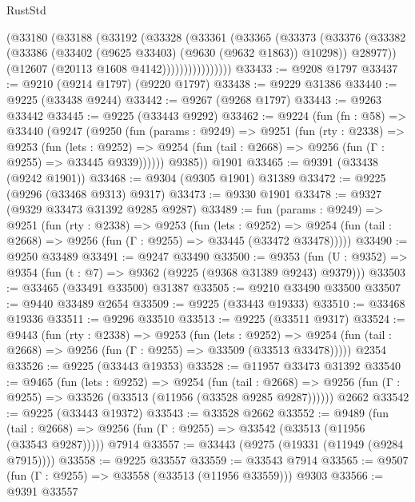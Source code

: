 \begin{lexlean}{RustStd}
\begin{coremodule}
                  (@33180
                    (@33188
                      (@33192
                        (@33328
                          (@33361
                            (@33365
                              (@33373
                                (@33376
                                  (@33382
                                    (@33386 (@33402 (@9625 @33403) (@9630 (@9632 @1863)) @10298))
                                    @28977))
                                (@12607 (@20113 @1608 @4142))))))))))))))))
@33433 := @9208 @1797
@33437 := @9210 (@9214 @1797) (@9220 @1797)
@33438 := @9229 @31386
@33440 := @9225 (@33438 @9244)
@33442 := @9267 (@9268 @1797)
@33443 := @9263 @33442
@33445 := @9225 (@33443 @9292)
@33462 := @9224
    (fun (fn : @58) =>
    @33440
      (@9247
        (@9250
          (fun (params : @9249) =>
          @9251
            (fun (rty : @2338) =>
            @9253
              (fun (lets : @9252) =>
              @9254 (fun (tail : @2668) => @9256 (fun (Γ : @9255) => @33445 @9339))))))
        @9385))
    @1901
@33465 := @9391 (@33438 (@9242 @1901))
@33468 := @9304 (@9305 @1901) @31389
@33472 := @9225 (@9296 (@33468 @9313) @9317)
@33473 := @9330 @1901
@33478 := @9327 (@9329 @33473 @31392 @9285 @9287)
@33489 := fun (params : @9249) =>
  @9251
    (fun (rty : @2338) =>
    @9253
      (fun (lets : @9252) =>
      @9254 (fun (tail : @2668) => @9256 (fun (Γ : @9255) => @33445 (@33472 @33478)))))
@33490 := @9250 @33489
@33491 := @9247 @33490
@33500 := @9353
    (fun (U : @9352) => @9354 (fun (t : @7) => @9362 (@9225 (@9368 @31389 @9243) @9379)))
@33503 := @33465 (@33491 @33500) @31387
@33505 := @9210 @33490 @33500
@33507 := @9440 @33489 @2654
@33509 := @9225 (@33443 @19333)
@33510 := @33468 @19336
@33511 := @9296 @33510
@33513 := @9225 (@33511 @9317)
@33524 := @9443
    (fun (rty : @2338) =>
    @9253
      (fun (lets : @9252) =>
      @9254 (fun (tail : @2668) => @9256 (fun (Γ : @9255) => @33509 (@33513 @33478)))))
    @2354
@33526 := @9225 (@33443 @19353)
@33528 := @11957 @33473 @31392
@33540 := @9465
    (fun (lets : @9252) =>
    @9254
      (fun (tail : @2668) =>
      @9256 (fun (Γ : @9255) => @33526 (@33513 (@11956 (@33528 @9285 @9287))))))
    @2662
@33542 := @9225 (@33443 @19372)
@33543 := @33528 @2662
@33552 := @9489
    (fun (tail : @2668) => @9256 (fun (Γ : @9255) => @33542 (@33513 (@11956 (@33543 @9287)))))
    @7914
@33557 := @33443 (@9275 (@19331 (@11949 (@9284 @7915))))
@33558 := @9225 @33557
@33559 := @33543 @7914
@33565 := @9507 (fun (Γ : @9255) => @33558 (@33513 (@11956 @33559))) @9303
@33566 := @9391 @33557

\end{coremodule}
\end{lexlean}

